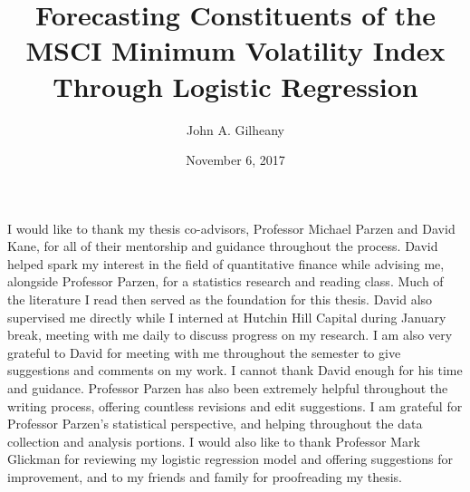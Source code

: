 \documentclass[12pt,twoside]{reedthesis}
\title{Forecasting Constituents of the MSCI Minimum Volatility Index Through
Logistic Regression}
\author{John A. Gilheany}
\date{November 6, 2017}
\theoremstyle{definition}
\theoremstyle{definition}
\theoremstyle{definition}
\theoremstyle{remark}
\begin{document}
  \maketitle

\frontmatter %
\pagestyle{empty} %
  \begin{acknowledgements}
    I would like to thank my thesis co-advisors, Professor Michael Parzen
    and David Kane, for all of their mentorship and guidance throughout the
    process. David helped spark my interest in the field of quantitative
    finance while advising me, alongside Professor Parzen, for a statistics
    research and reading class. Much of the literature I read then served as
    the foundation for this thesis. David also supervised me directly while
    I interned at Hutchin Hill Capital during January break, meeting with me
    daily to discuss progress on my research. I am also very grateful to
    David for meeting with me throughout the semester to give suggestions
    and comments on my work. I cannot thank David enough for his time and
    guidance. Professor Parzen has also been extremely helpful throughout
    the writing process, offering countless revisions and edit suggestions.
    I am grateful for Professor Parzen's statistical perspective, and
    helping throughout the data collection and analysis portions. I would
    also like to thank Professor Mark Glickman for reviewing my logistic
    regression model and offering suggestions for improvement, and to my
    friends and family for proofreading my thesis.
  \end{acknowledgements}

  \hypersetup{linkcolor=black}
  \setcounter{tocdepth}{2}
  \tableofcontents

  \listoftables
\end{document}
